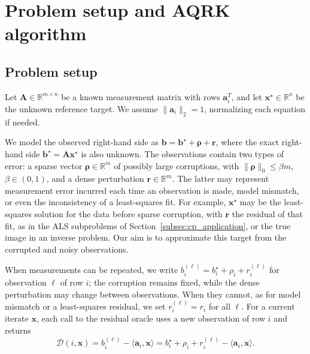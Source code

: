 \documentclass[pdflatex,sn-mathphys-num]{sn-jnl}
\theoremstyle{thmstyleone}
\theoremstyle{thmstylethree}
\newcommand{\mA}{\mathbf{A}}
\newcommand{\vb}{\mathbf{b}}
\newcommand{\vx}{\mathbf{x}}
\newcommand{\va}{\mathbf{a}}
\newcommand{\vr}{\mathbf{r}}
\begin{document}
\section{Problem setup and AQRK algorithm}
\label{sec:algorithm}

\subsection{Problem setup}
\label{subsec:problem_setup}
Let $\mA\in\mathbb R^{m\times n}$ be a known measurement matrix with rows
$\va_i^T$, and let $\vx^\star\in\mathbb R^n$ be the unknown reference target.
We assume $\|\va_i\|_2=1$, normalizing each equation if needed.

We model the observed right-hand side as $\vb=\vb^\star+\boldsymbol\rho+\vr$,
where the exact right-hand side $\vb^\star=\mA\vx^\star$ is also unknown.
The observations contain two types of error: a sparse vector
$\boldsymbol\rho\in\mathbb R^m$ of possibly large corruptions, with
$\|\boldsymbol\rho\|_0\le\beta m$, $\beta\in(0,1)$, and a dense perturbation
$\vr\in\mathbb R^m$. The latter may represent measurement error incurred each
time an observation is made, model mismatch, or even the inconsistency of a
least-squares fit. For example, $\vx^\star$ may be the least-squares solution for the data before sparse corruption, with $\vr$ the residual of that fit, as in the ALS subproblems of Section~\ref{subsec:cp_application}, or the true image in an inverse problem. Our aim is to approximate this
target from the corrupted and noisy observations.

When measurements can be repeated, we write
$b_i^{(\ell)}=b_i^\star+\rho_i+r_i^{(\ell)}$ for observation $\ell$ of row $i$;
the corruption remains fixed, while the dense perturbation may change between
observations. When they cannot, as for model mismatch or a least-squares
residual, we set $r_i^{(\ell)}=r_i$ for all $\ell$. For a current iterate
$\vx$, each call to the residual oracle uses a new observation of row $i$ and
returns
\begin{equation}
\label{eq:oracle-notation}
\mathcal D(i,\vx)=b_i^{(\ell)}-\langle\va_i,\vx\rangle
=b_i^\star+\rho_i+r_i^{(\ell)}-\langle\va_i,\vx\rangle.
\end{equation}
\end{document}
